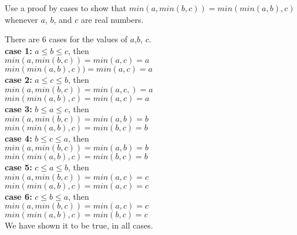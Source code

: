 \documentclass[12pt,addpoints]{exam}
\begin{document}
\begin{questions}
\question Use a proof by cases to show that $min(a, min(b,c)) =
min(min(a,b),c)$ whenever $a$, $b$, and $c$ are real numbers.
    \ifprintanswers
        \vspace{-10pt}
    \fi
\begin{solution}
    There are 6 cases for the values of $a$,$b$, $c$. \\
    \textbf{case 1:} $a \leq b \leq c$, then \\
        $min(a, min(b,c)) = min(a,c) = a$ \\
        $min(min(a,b),c)) = min(a,c) = a$ \\
    \textbf{case 2:} $a \leq c \leq b$, then \\
        $min(a, min(b,c)) = min(a,c,) = a$ \\
        $min(min(a,b),c) = min(a,c) = a$ \\
    \textbf{case 3:} $b \leq a \leq c$, then \\
        $min(a, min(b,c)) = min(a,b) = b$\\
        $min(min(a,b),c) = min(b,c) = b$ \\
    \textbf{case 4:} $b \leq c \leq a$, then \\
        $min(a, min(b,c)) = min(a,b) = b$ \\
        $min(min(a,b),c) = min(b,c) = b$ \\
    \textbf{case 5:} $c \leq a \leq b$, then \\
        $min(a, min(b,c)) = min(a,c) = c$\\
        $min(min(a,b),c) = min(a,c) = c$ \\
    \textbf{case 6:} $c \leq b \leq a$, then \\
        $min(a, min(b,c)) = min(a,c) = c$ \\
        $min(min(a,b),c) = min(b,c) = c$ \\
    We have shown it to be true, in all cases.
\end{solution}



\end{questions}
\end{document}
